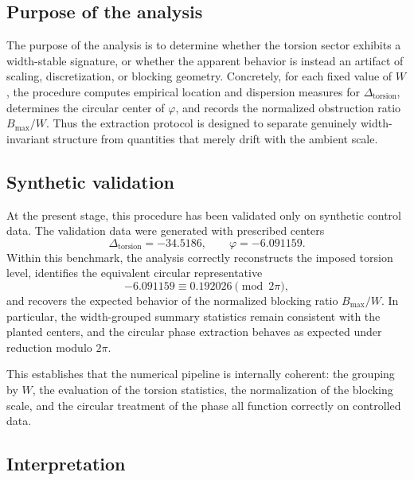 \documentclass[11pt,a4paper]{article}
\begin{document}
	\subsection{Purpose of the analysis}
	
	The purpose of the analysis is to determine whether the torsion sector exhibits a width-stable signature, or whether the apparent behavior is instead an artifact of scaling, discretization, or blocking geometry. Concretely, for each fixed value of \(W\), the procedure computes empirical location and dispersion measures for \(\Delta_{\mathrm{torsion}}\), determines the circular center of \(\varphi\), and records the normalized obstruction ratio \(B_{\max}/W\). Thus the extraction protocol is designed to separate genuinely width-invariant structure from quantities that merely drift with the ambient scale.
	
	\subsection{Synthetic validation}
	
	At the present stage, this procedure has been validated only on synthetic control data. The validation data were generated with prescribed centers
	\begin{equation}\label{eq:synthetic-centers}
		\Delta_{\mathrm{torsion}}=-34.5186,
		\qquad
		\varphi=-6.091159.
	\end{equation}
	Within this benchmark, the analysis correctly reconstructs the imposed torsion level, identifies the equivalent circular representative
	\begin{equation}\label{eq:circular-phase-representative}
		-6.091159 \equiv 0.192026 \pmod{2\pi},
	\end{equation}
	and recovers the expected behavior of the normalized blocking ratio \(B_{\max}/W\). In particular, the width-grouped summary statistics remain consistent with the planted centers, and the circular phase extraction behaves as expected under reduction modulo \(2\pi\).
	
	This establishes that the numerical pipeline is internally coherent: the grouping by \(W\), the evaluation of the torsion statistics, the normalization of the blocking scale, and the circular treatment of the phase all function correctly on controlled data.
	
	\subsection{Interpretation}
	
\end{document}
